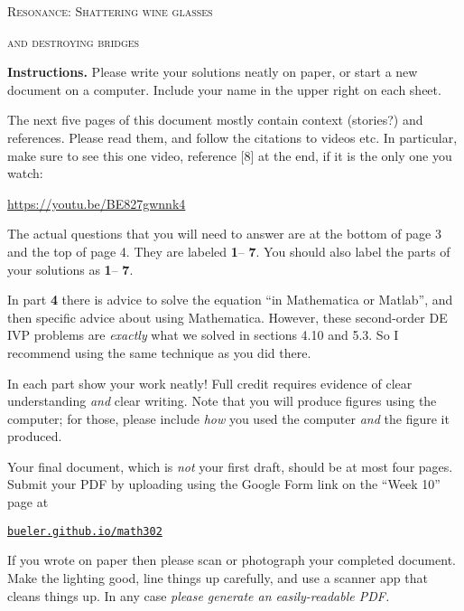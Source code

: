 \documentclass[12pt]{article}
\theoremstyle{definition}
\begin{document}
\setcounter{page}{0}
\renewcommand{\d}{\displaystyle}

\strut
\centerline{{\Large \textsc{Resonance: Shattering wine glasses}}}

\medskip
\centerline{{\Large \textsc{and destroying bridges}}}

\bigskip

\noindent \textbf{Instructions.}  Please write your solutions neatly on paper, or start a new document on a computer.  Include your name in the upper right on each sheet.

\medskip
The next five pages of this document mostly contain context (stories?) and references.  Please read them, and follow the citations to videos etc.  In particular, make sure to see this one video, reference [8] at the end, if it is the only one you watch:

\medskip
\centerline{\url{https://youtu.be/BE827gwnnk4}}

\medskip
The actual questions that you will need to answer are at the bottom of page 3 and the top of page 4.  They are labeled \textbf{1}-- \textbf{7}.  You should also label the parts of your solutions as \textbf{1}-- \textbf{7}.

\medskip
In part \textbf{4} there is advice to solve the equation ``in Mathematica or Matlab'', and then specific advice about using Mathematica.  However, these second-order DE IVP problems are \emph{exactly} what we solved in sections 4.10 and 5.3.  So I recommend using the same technique as you did there.

\medskip
In each part show your work neatly!  Full credit requires evidence of clear understanding \emph{and} clear writing.  Note that you will produce figures using the computer; for those, please include \emph{how} you used the computer \emph{and} the figure it produced.

\medskip
Your final document, which is \emph{not} your first draft, should be at most four pages.  Submit your PDF by uploading using the Google Form link on the ``Week 10'' page at

\smallskip
     \centerline{\href{https://bueler.github.io/math302/index.html}{\texttt{bueler.github.io/math302}}}
 
\noindent If you wrote on paper then please scan or photograph your completed document.  Make the lighting good, line things up carefully, and use a scanner app that cleans things up.  In any case \emph{please generate an easily-readable PDF.}
\end{document}

